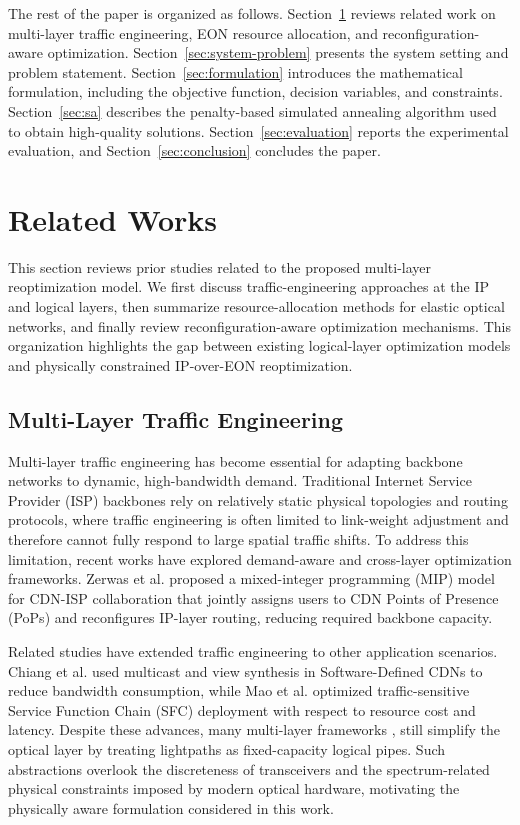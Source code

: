\documentclass[conference]{IEEEtran}
\begin{document}
The rest of the paper is organized as follows. Section~\ref{sec:related-work} reviews related work on multi-layer traffic engineering, EON resource allocation, and reconfiguration-aware optimization. Section~\ref{sec:system-problem} presents the system setting and problem statement. Section~\ref{sec:formulation} introduces the mathematical formulation, including the objective function, decision variables, and constraints. Section~\ref{sec:sa} describes the penalty-based simulated annealing algorithm used to obtain high-quality solutions. Section~\ref{sec:evaluation} reports the experimental evaluation, and Section~\ref{sec:conclusion} concludes the paper.

\section{Related Works}
\label{sec:related-work}

This section reviews prior studies related to the proposed multi-layer reoptimization model. We first discuss traffic-engineering approaches at the IP and logical layers, then summarize resource-allocation methods for elastic optical networks, and finally review reconfiguration-aware optimization mechanisms. This organization highlights the gap between existing logical-layer optimization models and physically constrained IP-over-EON reoptimization.

\subsection{Multi-Layer Traffic Engineering}

Multi-layer traffic engineering has become essential for adapting backbone networks to dynamic, high-bandwidth demand. Traditional Internet Service Provider (ISP) backbones rely on relatively static physical topologies and routing protocols, where traffic engineering is often limited to link-weight adjustment and therefore cannot fully respond to large spatial traffic shifts. To address this limitation, recent works have explored demand-aware and cross-layer optimization frameworks. Zerwas et al. \cite{9566292} proposed a mixed-integer programming (MIP) model for CDN-ISP collaboration that jointly assigns users to CDN Points of Presence (PoPs) and reconfigures IP-layer routing, reducing required backbone capacity.

Related studies have extended traffic engineering to other application scenarios. Chiang et al. \cite{10453465} used multicast and view synthesis in Software-Defined CDNs to reduce bandwidth consumption, while Mao et al. \cite{11007327} optimized traffic-sensitive Service Function Chain (SFC) deployment with respect to resource cost and latency. Despite these advances, many multi-layer frameworks \cite{9566292}, \cite{10453465} still simplify the optical layer by treating lightpaths as fixed-capacity logical pipes. Such abstractions overlook the discreteness of transceivers and the spectrum-related physical constraints imposed by modern optical hardware, motivating the physically aware formulation considered in this work.
\end{document}
